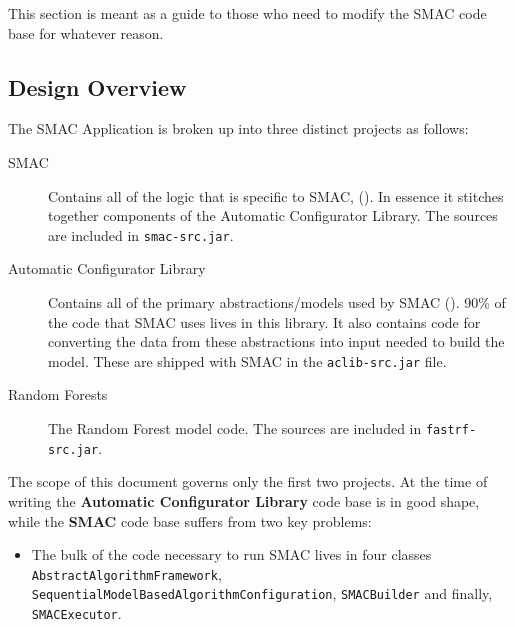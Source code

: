 \documentclass[manual.tex]{subfiles}
\begin{document}
This section is meant as a guide to those who need to modify the SMAC code base for whatever reason.

\subsection{Design Overview}

The SMAC Application is broken up into three distinct projects as follows:

\begin{description}

\item[SMAC] Contains all of the logic that is specific to SMAC, (). In essence it stitches together components of the Automatic Configurator Library. The sources are included in \texttt{smac-src.jar}.

\item[Automatic Configurator Library] Contains all of the primary abstractions/models used by SMAC (). 90\% of the code that SMAC uses lives in this library. It also contains code for converting the data from these abstractions into input needed to build the model. These are shipped with SMAC in the \texttt{aclib-src.jar} file.

\item[Random Forests] The Random Forest model code. The sources are included in \texttt{fastrf-src.jar}. 

\end{description}

The scope of this document governs only the first two projects. At the time of writing the \textbf{Automatic Configurator Library} code base is in good shape, while the \textbf{SMAC} code base suffers from two key problems:



\begin{itemize}

\item	The bulk of the code necessary to run SMAC lives in four classes \\ \texttt{AbstractAlgorithmFramework}, \\
 \texttt{SequentialModelBasedAlgorithmConfiguration}, \texttt{SMACBuilder} and finally, \\ \texttt{SMACExecutor}. 
\end{itemize}
\end{document}
